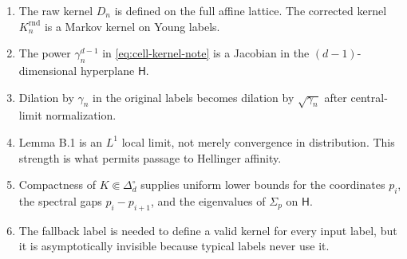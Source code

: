 \documentclass[11pt]{article}
\newcommand{\htile}{\mathsf H}
\begin{document}
\begin{enumerate}
  \item The raw kernel $D_n$ is defined on the full affine lattice.  The
  corrected kernel $K_n^{\mathrm{rnd}}$ is a Markov kernel on Young labels.
  \item The power $\gamma_n^{d-1}$ in
  \eqref{eq:cell-kernel-note} is a Jacobian in the
  $(d-1)$-dimensional hyperplane $\htile$.
  \item Dilation by $\gamma_n$ in the original labels becomes dilation by
  $\sqrt{\gamma_n}$ after central-limit normalization.
  \item Lemma B.1 is an $L^1$ local limit, not merely convergence in
  distribution.  This strength is what permits passage to Hellinger
  affinity.
  \item Compactness of $K\Subset\Delta_d^\circ$ supplies uniform lower
  bounds for the coordinates $p_i$, the spectral gaps $p_i-p_{i+1}$, and
  the eigenvalues of $\Sigma_p$ on $\htile$.
  \item The fallback label is needed to define a valid kernel for every
  input label, but it is asymptotically invisible because typical labels
  never use it.
\end{enumerate}
\end{document}
